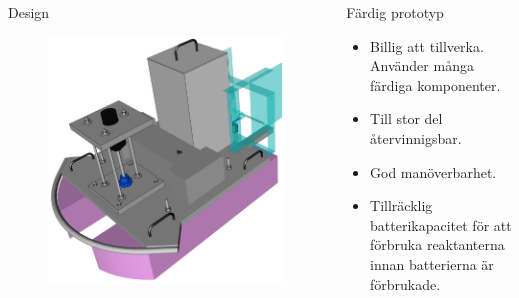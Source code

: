 \documentclass[final]{beamer}
\newlength{\onecolwid}
\begin{document}
\begin{frame}[t]
\begin{columns}[t, totalwidth=\textwidth]
\begin{column}{\onecolwid}
\begin{block}{Design}
        \vskip 6cm
        \begin{figure}[H]
          \centering
          \hbox{\hspace{-6cm}\includegraphics[width=27cm]{figures/front_box_off.png}}
        \end{figure}

      \end{block}

    \end{column}
    \begin{column}{\onecolwid}

      \begin{block}{Färdig prototyp}
        \begin{itemize}
        \item Billig att tillverka. Använder många färdiga komponenter.
        \item Till stor del återvinnigsbar.
        \item God manöverbarhet.
          \item Tillräcklig batterikapacitet för att förbruka reaktanterna innan batterierna är förbrukade.
        \end{itemize}


\end{block}
\end{column}
\end{columns}
\end{frame}
\end{document}
